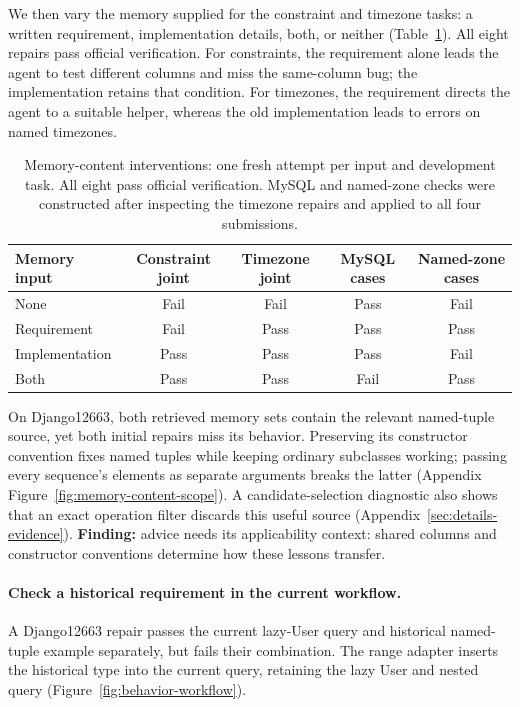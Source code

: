 We then vary the memory supplied for the constraint and timezone tasks:
a written requirement, implementation details, both, or neither
(Table~\ref{tab:memorycontent}). All eight repairs pass official verification.
For constraints, the requirement alone leads the agent to test different
columns and miss the same-column bug; the implementation retains that
condition. For timezones, the requirement directs the agent to a suitable
helper, whereas the old implementation leads to errors on named timezones.

\begin{table}[!htbp]
\centering
\caption{Memory-content interventions: one fresh attempt per input and development task.
All eight pass official verification. MySQL and named-zone checks were constructed
after inspecting the timezone repairs and applied to all four submissions.}
\label{tab:memorycontent}
\small
\begin{tabular}{lcccc}
\toprule
Memory input & Constraint joint & Timezone joint & MySQL cases & Named-zone cases \\
\midrule
None & Fail & Fail & Pass & Fail \\
Requirement & Fail & Pass & Pass & Pass \\
Implementation & Pass & Pass & Pass & Fail \\
Both & Pass & Pass & Fail & Pass \\
\bottomrule
\end{tabular}
\end{table}

On Django12663, both retrieved memory sets contain the relevant named-tuple
source, yet both initial repairs miss its behavior. Preserving its constructor
convention fixes named tuples while keeping ordinary subclasses working;
passing every sequence's elements as separate arguments breaks the latter
(Appendix Figure~\ref{fig:memory-content-scope}). A candidate-selection
diagnostic also shows that an exact operation filter discards this useful source
(Appendix~\ref{sec:details-evidence}).
\textbf{Finding:} advice needs its applicability context: shared columns
and constructor conventions determine how these lessons transfer.

\paragraph{Check a historical requirement in the current workflow.}
\label{sec:composition-results}
A Django12663 repair passes the current lazy-User query and historical
named-tuple example separately, but fails their combination. The range
adapter inserts the historical type into the current query, retaining the
lazy User and nested query (Figure~\ref{fig:behavior-workflow}).

